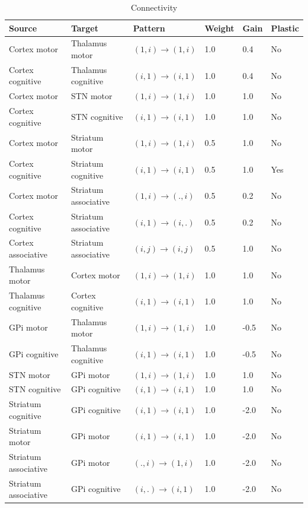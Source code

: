 \begin{table}[htbp]
  \small \centering
  \begin{tabular}{llllll}
\bf Source & \bf Target & \bf Pattern & \bf Weight & \bf Gain & \bf Plastic\\
\hline
Cortex motor & Thalamus motor & \((1,i) \rightarrow (1,i)\) & 1.0 & 0.4 & No\\
Cortex cognitive & Thalamus cognitive & \((i,1) \rightarrow (i,1)\) & 1.0 & 0.4 & No\\
Cortex motor & STN motor & \((1,i) \rightarrow (1,i)\) & 1.0 & 1.0 & No\\
Cortex cognitive & STN cognitive & \((i,1) \rightarrow (i,1)\) & 1.0 & 1.0 & No\\
Cortex motor & Striatum motor & \((1,i) \rightarrow (1,i)\) & 0.5 & 1.0 & No\\
Cortex cognitive & Striatum cognitive & \((i,1) \rightarrow (i,1)\) & 0.5 & 1.0 & Yes\\
Cortex motor & Striatum associative & \((1,i) \rightarrow (.,i)\) & 0.5 & 0.2 & No\\
Cortex cognitive & Striatum associative & \((i,1) \rightarrow (i,.)\) & 0.5 & 0.2 & No\\
Cortex associative & Striatum associative & \((i,j) \rightarrow (i,j)\) & 0.5 & 1.0 & No\\
Thalamus motor & Cortex motor & \((1,i) \rightarrow (1,i)\) & 1.0 & 1.0 & No\\
Thalamus cognitive & Cortex cognitive & \((i,1) \rightarrow (i,1)\) & 1.0 & 1.0 & No\\
GPi motor & Thalamus motor & \((1,i) \rightarrow (1,i)\) & 1.0 & -0.5 & No\\
GPi cognitive & Thalamus cognitive & \((i,1) \rightarrow (i,1)\) & 1.0 & -0.5 & No\\
STN motor & GPi motor & \((1,i) \rightarrow (1,i)\) & 1.0 & 1.0 & No\\
STN cognitive & GPi cognitive & \((i,1) \rightarrow (i,1)\) & 1.0 & 1.0 & No\\
Striatum cognitive & GPi cognitive & \((i,1) \rightarrow (i,1)\) & 1.0 & -2.0 & No\\
Striatum motor & GPi motor & \((i,1) \rightarrow (i,1)\) & 1.0 & -2.0 & No\\
Striatum associative & GPi motor & \((.,i) \rightarrow (1,i)\) & 1.0 & -2.0 & No\\
Striatum associative & GPi cognitive & \((i,.) \rightarrow (i,1)\) & 1.0 & -2.0 & No\\
\hline
\end{tabular}
\caption{Connectivity}
\end{table}




